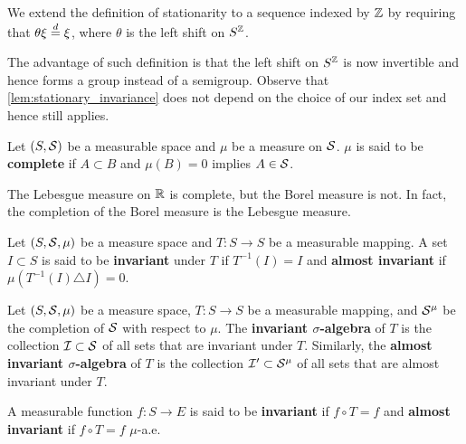 \begin{definition}
    We extend the definition of stationarity to a sequence indexed by 
    $\Z$ by requiring that $\theta\xi\deq\xi$, where $\theta$ is the 
    left shift on $S^\Z$.
\end{definition}
\begin{remark}
    The advantage of such definition is that the left shift on $S^\Z$ 
    is now invertible and hence forms a group instead of a semigroup. 
    Observe that \cref{lem:stationary_invariance} does not depend on 
    the choice of our index set and hence still applies.
\end{remark} 

\begin{definition}
    Let $(S,\S)$ be a measurable space and $\mu$ be a measure on $\S$. 
    $\mu$ is said to be \textbf{complete} if $A\subset B$ and $\mu(B) = 0$ 
    implies $A\in\S$.
\end{definition}
\begin{remark}
    The Lebesgue measure on $\R$ is complete, but the Borel measure is not. 
    In fact, the completion of the Borel measure is the Lebesgue measure.
\end{remark}

\begin{definition}
    Let $(S,\S,\mu)$ be a measure space and $T:S\to S$ be a measurable 
    mapping. A set $I\subset S$ is said to be \textbf{invariant} under $T$ 
    if $T^{-1}(I) = I$ and \textbf{almost invariant} if 
    $\mu(T^{-1}(I)\triangle I) = 0$.
\end{definition}

\begin{definition}
    Let $(S,\S,\mu)$ be a measure space, $T:S\to S$ be a measurable 
    mapping, and $\S^\mu$ be the completion of $\S$ with respect to $\mu$. 
    The \textbf{invariant $\sigma$-algebra} of $T$ is the collection 
    $\I\subset\S$ of all sets that are invariant under $T$. Similarly, 
    the \textbf{almost invariant $\sigma$-algebra} of $T$ is the collection 
    $\I'\subset\S^\mu$ of all sets that are almost invariant under $T$.
\end{definition}

\begin{definition}
    A measurable function $f:S\to E$ is said to be \textbf{invariant} if  
    $f\circ T = f$ and \textbf{almost invariant} if $f\circ T = f$ $\mu$-a.e.
\end{definition}